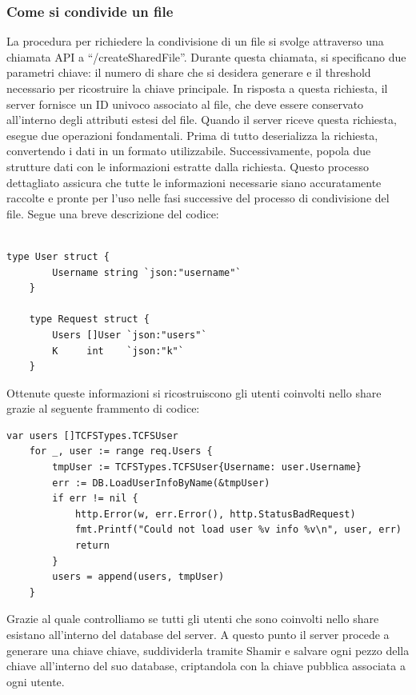\subsubsection{Come si condivide un file}
La procedura per richiedere la condivisione di un file si svolge attraverso una chiamata API a “/createSharedFile”. Durante questa chiamata, si specificano due parametri chiave: il numero di share che si desidera generare e il threshold necessario per ricostruire la chiave principale. In risposta a questa richiesta, il server fornisce un ID univoco associato al file, che deve essere conservato all’interno degli attributi estesi del file.
Quando il server riceve questa richiesta, esegue due operazioni fondamentali. Prima di tutto deserializza la richiesta, convertendo i dati in un formato utilizzabile. Successivamente, popola due strutture dati con le informazioni estratte dalla richiesta. Questo processo dettagliato assicura che tutte le informazioni necessarie siano accuratamente raccolte e pronte per l’uso nelle fasi successive del processo di condivisione del file. Segue una breve descrizione del codice:\\ \\

 \begin{lstlisting}[style=Go, caption=Strutture dati ottenute, label=go-structs]
 type User struct {
		Username string `json:"username"`
	}

	type Request struct {
		Users []User `json:"users"`
		K     int    `json:"k"`
	}
\end{lstlisting}
Ottenute queste informazioni si ricostruiscono gli utenti coinvolti nello share grazie al seguente frammento di codice:
 \begin{lstlisting}[style=Go, caption=Ottenimento informazioni utenti, label=go-build-TCFS-USERS]
var users []TCFSTypes.TCFSUser
	for _, user := range req.Users {
		tmpUser := TCFSTypes.TCFSUser{Username: user.Username}
		err := DB.LoadUserInfoByName(&tmpUser)
		if err != nil {
			http.Error(w, err.Error(), http.StatusBadRequest)
			fmt.Printf("Could not load user %v info %v\n", user, err)
			return
		}
		users = append(users, tmpUser)
	}
\end{lstlisting}
Grazie al quale controlliamo se tutti gli utenti che sono coinvolti nello share esistano all'interno del database del server. A questo punto il server procede a generare una chiave chiave, suddividerla tramite Shamir e salvare ogni pezzo della chiave all'interno del suo database, criptandola con la chiave pubblica associata a ogni utente.

